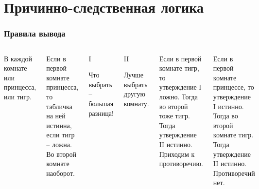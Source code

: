 \documentclass[aspectratio=169]{beamer}
\newcommand{\task}{
В каждой комнате или принцесса, или тигр.

Если в первой комнате принцесса, то табличка на ней истинна, если тигр -- ложна. Во второй комнате наоборот.

\begin{columns}
	\column{2.5cm}
	\begin{framed}
		\begin{center}
			I
			
			Что выбрать -- большая разница!
		\end{center}
	\end{framed}
	\column{2.5cm}
	\begin{framed}
		\begin{center}
			II
			
			Лучше выбрать другую комнату.
		\end{center}
	\end{framed}
\end{columns}	
}
\begin{document}
\renewcommand{\ImageSource}{L2-Images/}
\newcommand{\firstcircle}{(-1,0) circle (1.5)}
\newcommand{\secondcircle}{(1,0) circle (1.5)}
\newcommand{\thirdcircle}{(0,1.73) circle (1.5)}

\section{Причинно-следственная логика}

\begin{frame}\frametitle{Правила вывода}
\begin{center}
\begin{minipage}{0.5\textwidth}

	


\end{minipage}
\end{center}
\end{frame}

\begin{frame}[plain]
\begin{columns}
\task


Если в первой комнате тигр, то утверждение I ложно. Тогда во второй тоже тигр. Тогда утверждение II истинно. Приходим к противоречию.

Если в первой комнате принцессе, то утверждение I истинно. Тогда во второй комнате тигр. Тогда утверждение II истинно. Противоречий нет.

\end{columns}
\end{frame}
\end{document}
